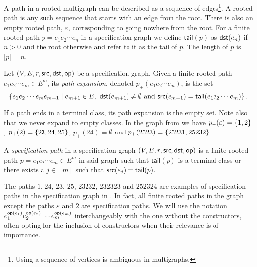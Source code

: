 A path in a rooted multigraph can be described as a sequence of edges\footnote{Using a sequence of vertices is ambiguous in multigraphs.}. A rooted path is any such sequence that starts with an edge from the root. There is also an empty rooted path, $\varepsilon$, corresponding to going nowhere from the root. For a finite rooted path $p=e_1e_2\dotsm e_n$ in a specification graph we define $\textsf{tail}(p)$ as $\textsf{dst}(e_n)$ if $n>0$ and the root otherwise and refer to it as the tail of $p$. The length of $p$ is $|p|=n$.

\begin{definition}
Let $(V,E,r,\textsf{src},\textsf{dst},\textsf{op})$ be a specification graph. Given a finite rooted path $e_1e_2\dotsm e_m \in E^m$, its \emph{path expansion}, denoted $p_+(e_1e_2\dotsm e_m)$,
is the set 
\[
    \left\{e_1e_2\dotsm e_m e_{m+1} \mid e_{m+1} \in E, \ \textsf{dst}(e_{m+1}) \neq \emptyset \text{ and } \textsf{src}(e_{m+1}) = \textsf{tail}(e_1e_2\dotsm e_m)\right\}.
\]
\end{definition}
If a path ends in a terminal class, its path expansion is the empty set. Note also that we never expand to empty classes. In the graph from  we have $p_+(\varepsilon) = \left\{1,2\right\}$, $p_+(2) = \left\{23,24,25\right\}$, $p_+(24) = \emptyset$ and $p_+(2523) = \left\{25231, 25232\right\}$.


\begin{definition}
A \emph{specification path} in a specification graph $(V,E,r,\textsf{src},\textsf{dst},\textsf{op})$ is a finite rooted path $p=e_1e_2\dotsm e_m \in E^m$ in said graph such that $\textsf{tail}(p)$ is a terminal class or there exists a $j\in[m]$ such that $\textsf{src}(e_j) = \textsf{tail}(p)$.
\end{definition}
The paths $1$, $24$, $23$, $25$, $23232$, $232323$ and $252324$ are examples of specification paths in the specification graph in . In fact, all finite rooted paths in the graph except the paths $\varepsilon$ and $2$ are specification paths. We will use the notation $e_1^{\textsf{op}(e_1)}e_2^{\textsf{op}(e_2)}\dotsm e_m^{\textsf{op}(e_m)}$ interchangeably with the one without the constructors, often opting for the inclusion of constructors when their relevance is of importance. 

